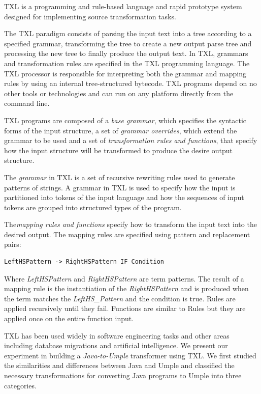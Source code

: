 TXL \cite{Cordy2006} is a programming and rule-based language and rapid prototype system designed for implementing source transformation tasks. 


The TXL paradigm consists of parsing the input text into a tree according to a specified grammar, transforming the tree to create a new output parse tree and processing the new tree to finally produce the output text. In TXL, grammars and transformation rules are specified in the TXL programming language. The TXL processor is responsible for interpreting both the grammar and mapping rules by using an internal tree-structured bytecode. TXL programs depend on no other tools or technologies and can run on any platform directly from the command line.

TXL programs are composed of a\textit{ base grammar}, which specifies the syntactic forms of the input structure, a set of \textit{grammar overrides}, which extend the grammar to be used and a set of \textit{transformation rules and functions}, that specify how the input structure will be transformed to produce the desire output structure.

The \textit{grammar} in TXL is a set of recursive rewriting rules used to generate patterns of strings. A grammar in TXL is used to specify how the input is partitioned into tokens of the input language and how the sequences of input tokens are grouped into structured types of the program. 

The\textit{mapping rules and functions} specify how to transform the input text into the desired output. The mapping rules are specified using pattern and replacement pairs: 

\vspace{\baselineskip}
\begin{lstlisting}[style=umplePlain]
LeftHSPattern -> RightHSPattern IF Condition
\end{lstlisting}

Where \textit{LeftHSPattern} and \textit{RightHSPattern} are term patterns. The result of a mapping rule is the instantiation of the \textit{RightHSPattern} and is produced when the term matches the \textit{LeftHS\_Pattern} and the condition is true. Rules are applied recursively until they fail. Functions are similar to Rules but they are applied once on the entire function input.

TXL has been used widely in software engineering tasks and other areas including database migrations and artificial intelligence. We present our experiment in building a \textit{Java-to-Umple} transformer using TXL. We first studied the similarities and differences between Java and Umple and classified the necessary transformations for converting Java programs to Umple into three categories.

